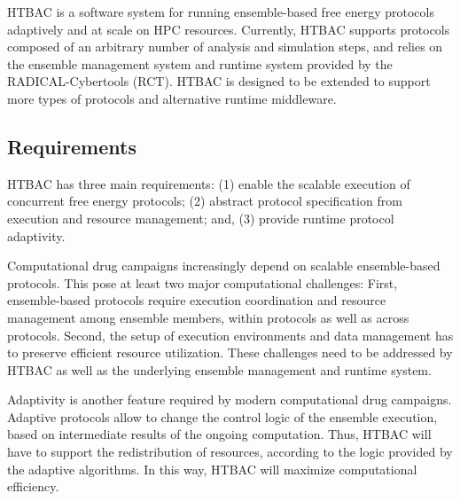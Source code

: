 HTBAC is a software system for running ensemble-based free energy protocols
adaptively and at scale on HPC resources. Currently, HTBAC supports protocols
composed of an arbitrary number of analysis and simulation steps, and relies
on the ensemble management system and runtime system provided by the
RADICAL-Cybertools (RCT). HTBAC is designed to be extended to support more
types of protocols and alternative runtime middleware.





\subsection{Requirements}

HTBAC has three main requirements: (1) enable the scalable execution of
concurrent free energy protocols; (2) abstract protocol specification from
execution and resource management; and, (3) provide runtime protocol
adaptivity.

Computational drug campaigns increasingly depend on scalable ensemble-based
protocols. This pose at least two major computational challenges: First,
ensemble-based protocols require execution coordination and resource
management among ensemble members, within protocols as well as across
protocols. Second, the setup of execution environments and data management
has to preserve efficient resource utilization. These challenges need to be
addressed by HTBAC as well as the underlying ensemble management and runtime
system.

Adaptivity is another feature required by modern computational drug
campaigns. Adaptive protocols allow to change the control logic of the
ensemble execution, based on intermediate results of the ongoing computation.
Thus, HTBAC will have to support the redistribution of resources, according
to the logic provided by the adaptive algorithms. In this way, HTBAC will
maximize computational efficiency.

